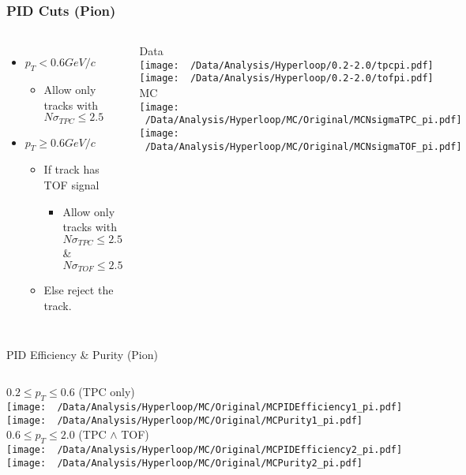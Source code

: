 \documentclass{beamer}
\begin{document}
\begin{frame}
	\frametitle{PID Cuts (Pion)}
	\begin{columns}
			\begin{itemize}
				\item $p_T<0.6GeV/c$
				\begin{itemize}
					\item Allow only tracks with $N\sigma_{TPC} \leq 2.5$
				\end{itemize}
				\item $p_T\geq 0.6GeV/c$
				\begin{itemize}
					\item If track has TOF signal
					\begin{itemize}
						\item Allow  only tracks with $N\sigma_{TPC} \leq 2.5$ \& $N\sigma_{TOF}\leq 2.5$
					\end{itemize}
					\item Else reject the track.
				\end{itemize}
			\end{itemize}
		\centering
		{\tiny Data}\\
		\texttt{[image: ~/Data/Analysis/Hyperloop/0.2-2.0/tpcpi.pdf]}\\
		\texttt{[image: ~/Data/Analysis/Hyperloop/0.2-2.0/tofpi.pdf]}\\
		{\tiny MC}\\
		\texttt{[image: ~/Data/Analysis/Hyperloop/MC/Original/MCNsigmaTPC\_pi.pdf]}\\
		\texttt{[image: ~/Data/Analysis/Hyperloop/MC/Original/MCNsigmaTOF\_pi.pdf]}\\
	\end{columns}
\end{frame}
\begin{frame}{PID Efficiency \& Purity (Pion)}
	\begin{columns}
		\centering
		$0.2\leq p_T \leq 0.6$ (TPC only)\\
		\texttt{[image: ~/Data/Analysis/Hyperloop/MC/Original/MCPIDEfficiency1\_pi.pdf]}\\
		\texttt{[image: ~/Data/Analysis/Hyperloop/MC/Original/MCPurity1\_pi.pdf]}
		\centering
		$0.6\leq p_T \leq 2.0$ (TPC $\land$ TOF)\\
		\texttt{[image: ~/Data/Analysis/Hyperloop/MC/Original/MCPIDEfficiency2\_pi.pdf]}\\
		\texttt{[image: ~/Data/Analysis/Hyperloop/MC/Original/MCPurity2\_pi.pdf]}
	\end{columns}
\end{frame}
\end{document}
